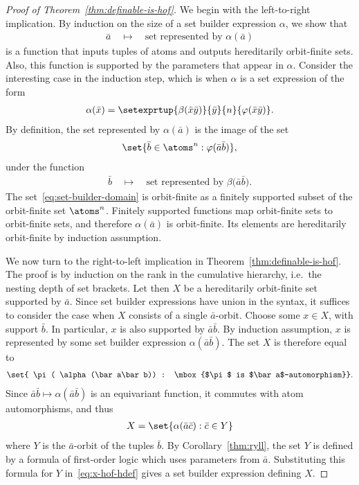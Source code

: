  
\begin{proof}[Proof of Theorem~\ref{thm:definable-is-hof}]
We begin with the left-to-right implication. By induction on the size of a set builder expression $\alpha$, we show that 
\begin{align*}
	\bar a \quad \mapsto \quad \text{set represented by $\alpha(\bar a)$}
\end{align*}
 is a function that inputs tuples of atoms and outputs hereditarily orbit-finite sets. Also, this function is supported by the parameters that appear in $\alpha$. Consider the interesting case in the induction step, which is when $\alpha$ is a set expression of the form
\begin{align*}
\alpha(\bar x) =		\setexprtup {\beta(\bar x \bar y)} {\bar y} {n} {\varphi(\bar x \bar y) }.
	\end{align*}
	By definition, the set represented by $\alpha(\bar a)$ is the image of the set 
	\begin{align}\label{eq:set-builder-domain}
		\set{\bar b \in \atoms^n : \varphi(\bar a \bar b)},
	\end{align}
	 under the function
	\begin{align}\label{eq:set-builder-transformation}
		\bar b \quad \mapsto \quad \text{set represented by $\beta(\bar a \bar b$)}.
	\end{align}
	The set~\eqref{eq:set-builder-domain} is orbit-finite as a finitely supported subset of the orbit-finite set $\atoms^n$. Finitely supported functions map orbit-finite sets to orbit-finite sets, and therefore $\alpha(\bar a)$ is orbit-finite. Its elements are hereditarily orbit-finite by induction assumption. 
	
	We now turn to the right-to-left implication in Theorem~\ref{thm:definable-is-hof}. The proof is by induction on the rank in the cumulative hierarchy, i.e.~the nesting depth of set brackets. Let then $X$ be a hereditarily orbit-finite set supported by $\bar a$. Since set builder expressions have union in the syntax, it suffices to consider the case when $X$ consists of a single $\bar a$-orbit. Choose some $x \in X$, with support $\bar b$. In particular, $x$ is also supported by $\bar a \bar b$. By induction assumption, $x$ is represented by some set builder expression $\alpha(\bar a \bar b)$. The set $X$ is therefore equal to 
	\begin{align*}
		 \set{ \pi( \alpha(\bar a\bar b)) : \mbox{$\pi$ is $\bar a$-automorphism}}.
	\end{align*}
	Since $\bar a \bar b \mapsto \alpha(\bar a \bar b)$ is an equivariant function, it commutes with atom automorphisms, and thus
	\begin{align}\label{eq:x-hof-hdef}
 X = 	\set{{\alpha}(\bar a \bar c) : \bar c \in Y }
 \end{align}
 where $Y$ is the $\bar a$-orbit of the tuples $\bar b$. By Corollary~\ref{thm:ryll}, the set $Y$ is defined by a formula of first-order logic which uses parameters from $\bar a$. Substituting this formula for $Y$ in~\ref{eq:x-hof-hdef} gives a set builder expression defining $X$.
\end{proof}






